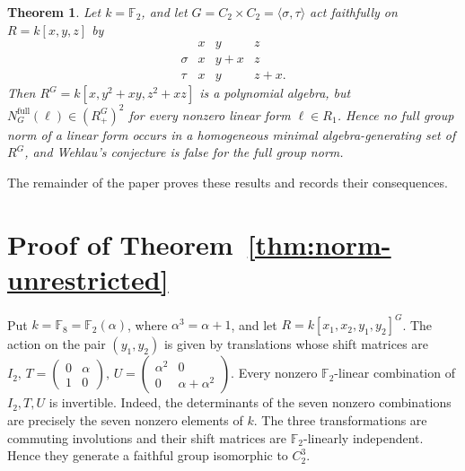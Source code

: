 \documentclass[11pt]{article}
\newtheorem{theorem}{Theorem}[section]
\theoremstyle{definition}
\begin{document}
	\begin{theorem}\label{thm:norm-counterexample}
		Let $k=\mathbb F_2$, and let $G=C_2\times C_2=\langle\sigma,\tau\rangle$ act faithfully on $R=k[x,y,z]$ by
		\[
		\begin{array}{c|ccc}
			&x&y&z\\ \hline
			\sigma&x&y+x&z\\
			\tau&x&y&z+x.
		\end{array}
		\]
		Then $R^G=k[x,y^2+xy,z^2+xz]$ is a polynomial algebra, but $N_G^{\mathrm{full}}(\ell)\in(R^G_+)^2$ for every nonzero linear form $\ell\in R_1$. Hence no full group norm of a linear form occurs in a homogeneous minimal algebra-generating set of $R^G$, and Wehlau's conjecture is false for the full group norm.
	\end{theorem}


	The remainder of the paper proves these results and records their consequences.

\section{Proof of Theorem~\ref{thm:norm-unrestricted}}
\label{sec:unrestricted-norm}

Put $k=\mathbb F_8=\mathbb F_2(\alpha)$, where $\alpha^3=\alpha+1$, and let $R=k[x_1,x_2,y_1,y_2]^G$.  The action on the pair $(y_1,y_2)$ is given by translations whose shift matrices are $I_2,\,
T=\begin{pmatrix}0&\alpha\\ 1&0\end{pmatrix},\,
U=\begin{pmatrix}\alpha^2&0\\0&\alpha+\alpha^2\end{pmatrix}$. Every nonzero $\mathbb F_2$-linear combination of $I_2,T,U$ is
invertible.  Indeed, the determinants of the seven nonzero
combinations are precisely the seven nonzero elements of $k$.  The
three transformations are commuting involutions and their shift
matrices are $\mathbb F_2$-linearly independent.  Hence they generate a faithful group isomorphic to $C_2^3$.
\end{document}

